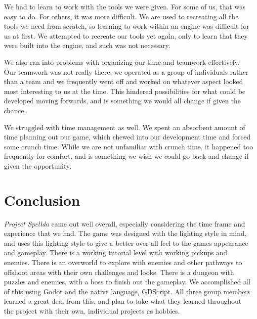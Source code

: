 \documentclass{sigchi}
\begin{document}
We had to learn to work with the tools we were given.  For some of us, that was easy to do.  For others, it was more difficult.  We are used to recreating all the tools we need from scratch, so learning to work within an engine was difficult for us at first.  We attempted to recreate our tools yet again, only to learn that they were built into the engine, and such was not necessary.

We also ran into problems with organizing our time and teamwork effectively.  Our teamwork was not really there; we operated as a group of individuals rather than a team and we frequently went off and worked on whatever aspect looked most interesting to us at the time.  This hindered possibilities for what could be developed moving forwards, and is something we would all change if given the chance.

We struggled with time management as well.  We spent an absorbent amount of time planning out our game, which chewed into our development time and forced some crunch time.  While we are not unfamiliar with crunch time, it happened too frequently for comfort, and is something we wish we could go back and change if given the opportunity.  


\section{Conclusion}
\emph{Project Spellda} came out well overall, especially considering the time frame and experience that we had. The game was designed with the lighting style in mind, and uses this lighting style
to give a better over-all feel to the games appearance and gameplay. There is a working tutorial level with working pickups and enemies. There is an overworld to explore with enemies and other pathways
to offshoot areas with their own challenges and looks. There is a dungeon with puzzles and enemies, with a boss to finish out the gameplay. We accomplished all of this using Godot and the native
language, GDScript. All three group members learned a great deal from this, and plan to take what they learned throughout the project with their own, individual projects as hobbies.




\end{document}
